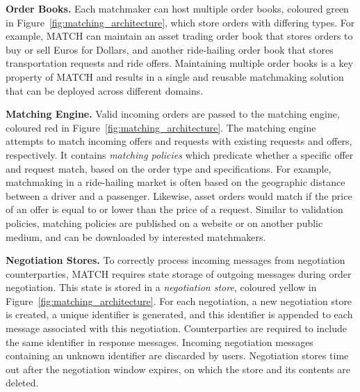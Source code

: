 \textbf{Order Books.}
Each matchmaker can host multiple order books, coloured green in Figure~\ref{fig:matching_architecture}, which store orders with differing types.
For example, MATCH can maintain an asset trading order book that stores orders to buy or sell Euros for Dollars, and another ride-hailing order book that stores transportation requests and ride offers.
Maintaining multiple order books is a key property of MATCH and results in a single and reusable matchmaking solution that can be deployed across different domains.

\textbf{Matching Engine.}
Valid incoming orders are passed to the matching engine, coloured red in Figure~\ref{fig:matching_architecture}.
The matching engine attempts to match incoming offers and requests with existing requests and offers, respectively.
It contains \emph{matching policies} which predicate whether a specific offer and request match, based on the order type and specifications.
For example, matchmaking in a ride-hailing market is often based on the geographic distance between a driver and a passenger.
Likewise, asset orders would match if the price of an offer is equal to or lower than the price of a request.
Similar to validation policies, matching policies are published on a website or on another public medium, and can be downloaded by interested matchmakers.

\textbf{Negotiation Stores.}
To correctly process incoming messages from negotiation counterparties, MATCH requires state storage of outgoing messages during order negotiation.
This state is stored in a \emph{negotiation store}, coloured yellow in Figure~\ref{fig:matching_architecture}.
For each negotiation, a new negotiation store is created, a unique identifier is generated, and this identifier is appended to each message associated with this negotiation.
Counterparties are required to include the same identifier in response messages.
Incoming negotiation messages containing an unknown identifier are discarded by users.
Negotiation stores time out after the negotiation window expires, on which the store and its contents are deleted.

